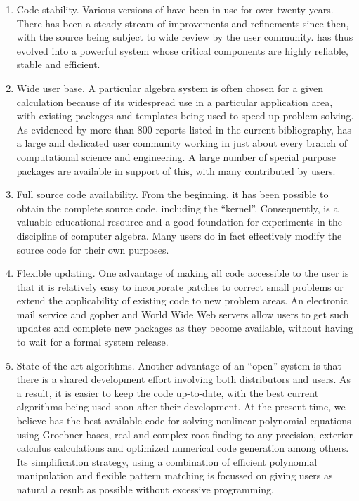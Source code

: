 \begin{enumerate}
\item Code stability.  Various versions of {\REDUCE} have been in use for over
twenty years.  There has been a steady stream of improvements and
refinements since then, with the source being subject to wide review by the
user community.  {\REDUCE} has thus evolved into a powerful system whose
critical components are highly reliable, stable and efficient.

\item Wide user base.  A particular algebra system is often chosen for a
given calculation because of its widespread use in a particular
application area, with existing packages and templates being used to speed
up problem solving.  As evidenced by more than 800 reports listed in the
current bibliography, {\REDUCE} has a large and dedicated user community
working in just about every branch of computational science and
engineering.  A large number of special purpose packages are available in
support of this, with many contributed by users.

\item Full source code availability.  From the beginning, it has been
possible to obtain the complete {\REDUCE} source code, including the
``kernel''.  Consequently, {\REDUCE} is a valuable educational resource and a
good foundation for experiments in the discipline of computer algebra.  Many
users do in fact effectively modify the source code for their own purposes.

\item Flexible updating.  One advantage of making all code accessible to the
user is that it is relatively easy to incorporate patches to correct
small problems or extend the applicability of existing code to new
problem areas.  An electronic mail service and gopher and World Wide Web
servers allow users to get such updates and complete new packages as they
become available, without having to wait for a formal system release.

\item State-of-the-art algorithms.  Another advantage of an ``open''
system is that there is a shared development effort involving both
distributors and users.  As a result, it is easier to keep the code
up-to-date, with the best current algorithms being used soon after their
development.  At the present time, we believe {\REDUCE} has the best
available code for solving nonlinear polynomial equations using Groebner
bases, real and complex root finding to any precision, exterior calculus
calculations and optimized numerical code generation among others.  Its
simplification strategy, using a combination of efficient polynomial
manipulation and flexible pattern matching is focussed on giving users as
natural a result as possible without excessive programming.


\end{enumerate}
